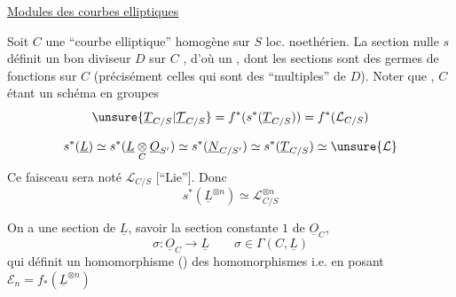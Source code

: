 
\uline{Modules des courbes elliptiques}

Soit $C$ une ``courbe elliptique'' homogène sur $S$ loc. noethérien. La section nulle $s$ définit un bon diviseur $D$ sur $C$ , d'où un ,  dont les  sections sont des  germes de fonctions sur $C$ (précisément celles qui sont des ``multiples'' de $D$). Noter que , $C$ étant un schéma en groupes
\[
\unsure{\underline T_{C/S}|\underline{\mathcal T}_{C/S}}=f^*(s^*(\underline T_{C/S}))=f^*(\mathcal L_{C/S})
\]

\[
s^*(\underline L)\simeq s^*(\underline L\underset C\otimes\underline O_{S'})\simeq s^*(\underline N_{C/S'})\simeq s^*(\underline T_{C/S})\simeq\unsure{\mathcal L}
\]
Ce faisceau sera noté $\mathcal L_{C/S}$ [``Lie'']. Donc
\[
s^*(\underline L^{\otimes n})\simeq\mathcal L_{C/S}^{\otimes n}
\]

On a une section  de $\underline L$, savoir la section constante $1$ de $\underline O_C$,
\[
\sigma:\underline O_C\longrightarrow\underline L\qquad \sigma\in\Gamma(C,\underline L)
\]
qui définit un homomorphisme ()
  des homomorphismes
i.e.
en posant $\mathcal E_n=f_*(\underline L^{\otimes n})$

